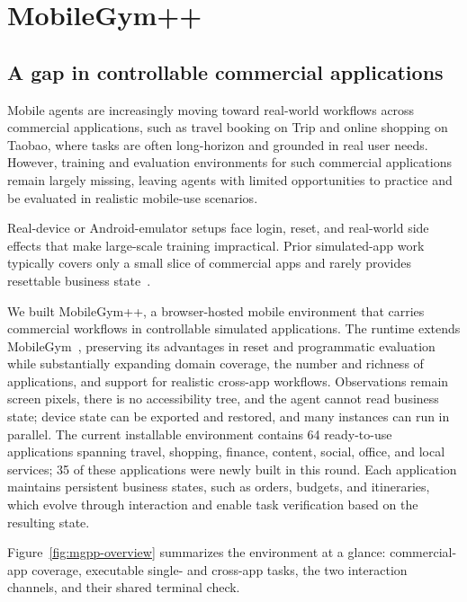 \section{MobileGym++}
\label{sec:mobilegym++}
\label{sec:method}

\subsection{A gap in controllable commercial applications}
\label{sec:mgpp-env}

Mobile agents are increasingly moving toward real-world workflows across commercial applications, such as travel booking on Trip and online shopping on Taobao, where tasks are often long-horizon and grounded in real user needs. However, training and evaluation environments for such commercial applications remain largely missing, leaving agents with limited opportunities to practice and be evaluated in realistic mobile-use scenarios.

Real-device or Android-emulator setups face login, reset, and real-world side effects that make large-scale training impractical. Prior simulated-app work typically covers only a small slice of commercial apps and rarely provides resettable business state~\citep{rawles2025androidworld,kong2025mobileworld}.

We built MobileGym++, a browser-hosted mobile environment that carries commercial workflows in controllable simulated applications. The runtime extends MobileGym~\citep{wu2026mobilegym}, preserving its advantages in reset and programmatic evaluation while substantially expanding domain coverage, the number and richness of applications, and support for realistic cross-app workflows. Observations remain screen pixels, there is no accessibility tree, and the agent cannot read business state; device state can be exported and restored, and many instances can run in parallel. The current installable environment contains 64 ready-to-use applications spanning travel, shopping, finance, content, social, office, and local services; 35 of these applications were newly built in this round. Each application maintains persistent business states, such as orders, budgets, and itineraries, which evolve through interaction and enable task verification based on the resulting state.

Figure~\ref{fig:mgpp-overview} summarizes the environment at a glance: commercial-app coverage, executable single- and cross-app tasks, the two interaction channels, and their shared terminal check.

